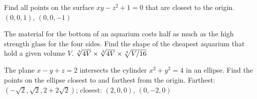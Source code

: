 \problem Find all points on the surface $xy-z^2+1=0$ that are closest to
the origin. 
\answer  $(0,0,1)$, $(0,0,-1)$
\endanswer

\problem The material for the bottom of an aquarium costs half as much as
the high strength glass for the four sides. Find the shape of the cheapest
aquarium that hold a given volume $V$. 
\answer  $\root 3\of{4V}\times\root
3\of{4V}\times\root 3\of{V/16}$
\endanswer

\problem The plane $x-y+z=2$ intersects the cylinder $x^2+y^2=4$ in an
ellipse. Find the points on the ellipse closest to and farthest from the
origin. 
\answer  Farthest: $(-\sqrt2,\sqrt2,2+2\sqrt2)$; closest:
$(2,0,0)$, $(0,-2,0)$
\endanswer



